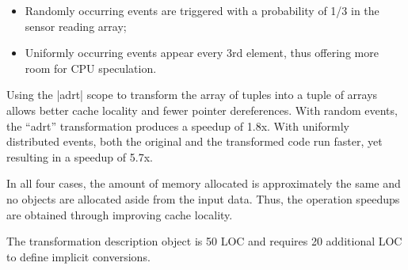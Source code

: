\begin{itemize}
 \item Randomly occurring events are triggered with a probability of 1/3 in the sensor reading array;
 \item Uniformly occurring events appear every 3rd element, thus offering more room for CPU speculation.
\end{itemize}

Using the |adrt| scope to transform the array of tuples into a tuple of arrays allows better cache locality and fewer pointer dereferences. With random events, the ``adrt'' transformation produces a speedup of 1.8x. With uniformly distributed events, both the original and the transformed code run faster, yet resulting in a speedup of 5.7x.

In all four cases, the amount of memory allocated is approximately the same and no objects are allocated aside from the input data. Thus, the operation speedups are obtained through improving cache locality.

The transformation description object is 50 LOC and requires 20 additional LOC to define implicit conversions.

